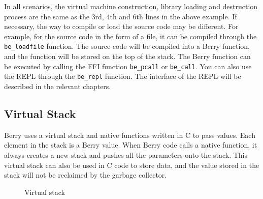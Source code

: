 In all scenarios, the virtual machine construction, library loading and destruction process are the same as the 3rd, 4th and 6th lines in the above example. If necessary, the way to compile or load the source code may be different. For example, for the source code in the form of a file, it can be compiled through the \texttt{be\_loadfile} function. The source code will be compiled into a Berry function, and the function will be stored on the top of the stack. The Berry function can be executed by calling the FFI function \texttt{be\_pcall} or \texttt{be\_call}. You can also use the REPL through the \texttt{be\_repl} function. The interface of the REPL will be described in the relevant chapters.

\subsection {Virtual Stack}

Berry uses a virtual stack and native functions written in C to pass values. Each element in the stack is a Berry value. When Berry code calls a native function, it always creates a new stack and pushes all the parameters onto the stack. This virtual stack can also be used in C code to store data, and the value stored in the stack will not be reclaimed by the garbage collector.

\begin{wrapfigure}{r}{0.5\textwidth}
\centering
{}
\caption{Virtual stack}
\label{fig::virtual_stack}
\end{wrapfigure}

